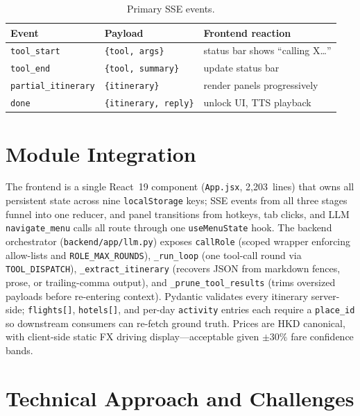 \documentclass{article}
\begin{document}
\begin{table}[t]
\caption{Primary SSE events.}
\label{tab:sse}
\centering
\renewcommand{\arraystretch}{0.95}
\small
\begin{tabular}{@{}lll@{}}
\toprule
\textbf{Event} & \textbf{Payload} & \textbf{Frontend reaction}\\
\midrule
\texttt{tool\_start} & \texttt{\{tool, args\}} & status bar shows ``calling X\dots''\\
\texttt{tool\_end}   & \texttt{\{tool, summary\}} & update status bar\\
\texttt{partial\_itinerary} & \texttt{\{itinerary\}} & render panels progressively\\
\texttt{done}        & \texttt{\{itinerary, reply\}} & unlock UI, TTS playback\\
\bottomrule
\end{tabular}
\end{table}


\section{Module Integration}
\label{sec:modules}

The frontend is a single React~19 component (\texttt{App.jsx},
2{,}203~lines) that owns all persistent state across nine
\texttt{localStorage} keys; SSE events from all three stages funnel
into one reducer, and panel transitions from hotkeys, tab clicks, and
LLM \texttt{navigate\_menu} calls all route through one
\texttt{useMenuState} hook. The backend orchestrator
(\texttt{backend/app/llm.py}) exposes \texttt{callRole}
(scoped wrapper enforcing allow-lists and \texttt{ROLE\_MAX\_ROUNDS}),
\texttt{\_run\_loop} (one tool-call round via \texttt{TOOL\_DISPATCH}),
\texttt{\_extract\_itinerary} (recovers JSON from markdown fences,
prose, or trailing-comma output), and \texttt{\_prune\_tool\_results}
(trims oversized payloads before re-entering context). Pydantic
validates every itinerary server-side; \texttt{flights[]},
\texttt{hotels[]}, and per-day \texttt{activity} entries each require
a \texttt{place\_id} so downstream consumers can re-fetch ground
truth. Prices are HKD canonical, with client-side static FX driving
display---acceptable given $\pm30\%$ fare confidence bands.

\section{Technical Approach and Challenges}
\label{sec:challenges}
\label{sec:bench}
\end{document}
